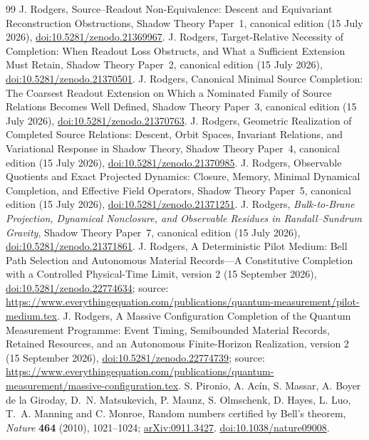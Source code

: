 \documentclass[11pt,a4paper]{article}
\theoremstyle{definition}
\theoremstyle{remark}\newtheorem{remark}[theorem]{Remark}
\begin{document}
\begin{thebibliography}{99}
 J. Rodgers, Source--Readout Non-Equivalence: Descent and Equivariant Reconstruction Obstructions, Shadow Theory Paper~1, canonical edition (15 July 2026), \href{https://doi.org/10.5281/zenodo.21369967}{doi:10.5281/zenodo.21369967}.
 J. Rodgers, Target-Relative Necessity of Completion: When Readout Loss Obstructs, and What a Sufficient Extension Must Retain, Shadow Theory Paper~2, canonical edition (15 July 2026), \href{https://doi.org/10.5281/zenodo.21370501}{doi:10.5281/zenodo.21370501}.
 J. Rodgers, Canonical Minimal Source Completion: The Coarsest Readout Extension on Which a Nominated Family of Source Relations Becomes Well Defined, Shadow Theory Paper~3, canonical edition (15 July 2026), \href{https://doi.org/10.5281/zenodo.21370763}{doi:10.5281/zenodo.21370763}.
 J. Rodgers, Geometric Realization of Completed Source Relations: Descent, Orbit Spaces, Invariant Relations, and Variational Response in Shadow Theory, Shadow Theory Paper~4, canonical edition (15 July 2026), \href{https://doi.org/10.5281/zenodo.21370985}{doi:10.5281/zenodo.21370985}.
 J. Rodgers, Observable Quotients and Exact Projected Dynamics: Closure, Memory, Minimal Dynamical Completion, and Effective Field Operators, Shadow Theory Paper~5, canonical edition (15 July 2026), \href{https://doi.org/10.5281/zenodo.21371251}{doi:10.5281/zenodo.21371251}.
 J. Rodgers, \emph{Bulk-to-Brane Projection, Dynamical Nonclosure, and Observable Residues in Randall--Sundrum Gravity}, Shadow Theory Paper~7, canonical edition (15 July 2026), \href{https://doi.org/10.5281/zenodo.21371861}{doi:10.5281/zenodo.21371861}.
 J. Rodgers, A Deterministic Pilot Medium: Bell Path Selection and Autonomous Material Records---A Constitutive Completion with a Controlled Physical-Time Limit, version 2 (15 September 2026), \href{https://doi.org/10.5281/zenodo.22774634}{doi:10.5281/zenodo.22774634}; source: \url{https://www.everythingequation.com/publications/quantum-measurement/pilot-medium.tex}.
 J. Rodgers, A Massive Configuration Completion of the Quantum Measurement Programme: Event Timing, Semibounded Material Records, Retained Resources, and an Autonomous Finite-Horizon Realization, version 2 (15 September 2026), \href{https://doi.org/10.5281/zenodo.22774739}{doi:10.5281/zenodo.22774739}; source: \url{https://www.everythingequation.com/publications/quantum-measurement/massive-configuration.tex}.
 S. Pironio, A. Ac\'in, S. Massar, A. Boyer de la Giroday, D.~N. Matsukevich, P. Maunz, S. Olmschenk, D. Hayes, L. Luo, T.~A. Manning and C. Monroe, Random numbers certified by Bell's theorem, \emph{Nature} \textbf{464} (2010), 1021--1024; \href{https://arxiv.org/abs/0911.3427}{arXiv:0911.3427}. \href{https://doi.org/10.1038/nature09008}{doi:10.1038/nature09008}.

\end{thebibliography}
\end{document}
